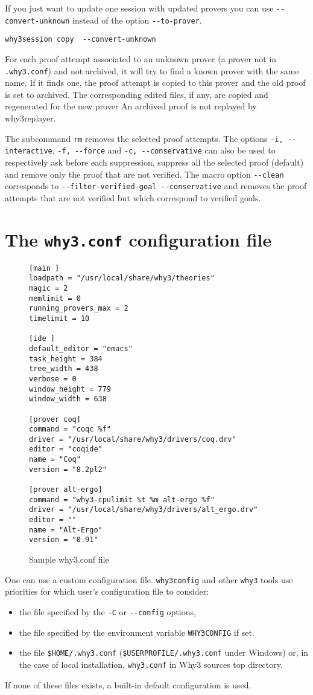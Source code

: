 If you just want to update one session with updated provers you can
use \verb|--convert-unknown| instead of the option \verb|--to-prover|.
\begin{verbatim}
why3session copy  --convert-unknown
\end{verbatim}
For each proof attempt associated to an unknown prover (a prover not in
\verb|.why3.conf|) and not archived, it will try to find a known prover
with the same name. If it finds one, the proof attempt is copied to this
prover and the old proof is set to archived. The corresponding edited
files, if any, are copied and regenerated for the new prover An archived
proof is not replayed by why3replayer.

The subcommand \texttt{rm} removes the selected proof
attempts. The options \verb|-i, --interactive|, \verb|-f, --force| and
\verb|-c, --conservative| can also be used to respectively ask before
each suppression, suppress all the selected proof (default) and remove
only the proof that are not verified. The macro option \verb|--clean|
corresponds to \verb|--filter-verified-goal --conservative| and
removes the proof attempts that are not verified but which correspond
to verified goals.

\section{The \texttt{why3.conf} configuration file}
\label{sec:whyconffile}


\begin{figure}[t]
\begin{verbatim}
[main ]
loadpath = "/usr/local/share/why3/theories"
magic = 2
memlimit = 0
running_provers_max = 2
timelimit = 10

[ide ]
default_editor = "emacs"
task_height = 384
tree_width = 438
verbose = 0
window_height = 779
window_width = 638

[prover coq]
command = "coqc %f"
driver = "/usr/local/share/why3/drivers/coq.drv"
editor = "coqide"
name = "Coq"
version = "8.2pl2"

[prover alt-ergo]
command = "why3-cpulimit %t %m alt-ergo %f"
driver = "/usr/local/share/why3/drivers/alt_ergo.drv"
editor = ""
name = "Alt-Ergo"
version = "0.91"
\end{verbatim}
  \caption{Sample why3.conf file}
\label{fig:why3conf}
\end{figure}



One can use a custom configuration file. \texttt{why3config}
and other \texttt{why3} tools use priorities for which
user's configuration file to consider:
\begin{itemize}
\item the file specified by the \texttt{-C} or \texttt{-{}-config} options,
\item the file specified by the environment variable
  \texttt{WHY3CONFIG} if set.
\item the file \texttt{\$HOME/.why3.conf}
  (\texttt{\$USERPROFILE/.why3.conf} under Windows) or, in the case of
  local installation, \texttt{why3.conf} in Why3 sources top directory.
\end{itemize}
If none of these files exists, a built-in default configuration is used.

